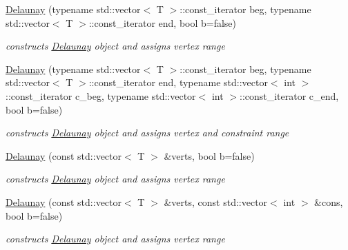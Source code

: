 \begin{DoxyCompactItemize}
\hyperlink{classDelaunay_af6c3c79ae6c3cf7925bb2e4bc0fd3d4b}{Delaunay} (typename std\+::vector$<$ T $>$\+::const\+\_\+iterator beg, typename std\+::vector$<$ T $>$\+::const\+\_\+iterator end, bool b=false)
\begin{DoxyCompactList}\small\item\em constructs \hyperlink{classDelaunay}{Delaunay} object and assigns vertex range \end{DoxyCompactList}\item 
\hyperlink{classDelaunay_a313655245cae6fc5bc0f1b1d24954637}{Delaunay} (typename std\+::vector$<$ T $>$\+::const\+\_\+iterator beg, typename std\+::vector$<$ T $>$\+::const\+\_\+iterator end, typename std\+::vector$<$ int $>$\+::const\+\_\+iterator c\+\_\+beg, typename std\+::vector$<$ int $>$\+::const\+\_\+iterator c\+\_\+end, bool b=false)
\begin{DoxyCompactList}\small\item\em constructs \hyperlink{classDelaunay}{Delaunay} object and assigns vertex and constraint range \end{DoxyCompactList}\item 
\hyperlink{classDelaunay_a8fac97cf626be17739f0f6b299592717}{Delaunay} (const std\+::vector$<$ T $>$ \&verts, bool b=false)
\begin{DoxyCompactList}\small\item\em constructs \hyperlink{classDelaunay}{Delaunay} object and assigns vertex range \end{DoxyCompactList}\item 
\hyperlink{classDelaunay_a309cee8815a537fff9126d7d00b29f52}{Delaunay} (const std\+::vector$<$ T $>$ \&verts, const std\+::vector$<$ int $>$ \&cons, bool b=false)
\begin{DoxyCompactList}\small\item\em constructs \hyperlink{classDelaunay}{Delaunay} object and assigns vertex range \end{DoxyCompactList}\end{DoxyCompactItemize}
